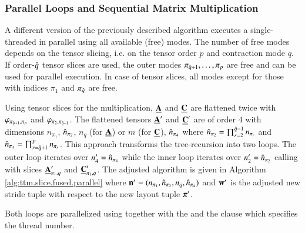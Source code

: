 \subsubsection{Parallel Loops and Sequential Matrix Multiplication}
A different version of the previously described algorithm executes a single-threaded  in parallel using all available (free) modes.
The number of free modes depends on the tensor slicing, i.e. on the tensor order $p$ and contraction mode $q$.
If order-$\hat{q}$ tensor slices are used, the outer modes $\pi_{\hat{q}+1}, \dots, \pi_{p}$ are free and can be used for parallel execution.
In case of tensor slices, all modes except for those with indices $\pi_1$ and $\pi_{\hat{q}}$ are free.



Using tensor slices for the multiplication, $\underline{\mathbf{A}}$ and $\underline{\mathbf{C}}$ are flattened twice with $\varphi_{\pi_{\hat{q}+1},\pi_p}$ and $\varphi_{\pi_{2},\pi_{\hat{q}-1}}$.
The flattened tensors $\underline{\mathbf{A}}'$ and $\underline{\mathbf{C}}'$ are of order $4$ with dimensions $n_{\pi_1}$, $\hat{n}_{\pi_2}$, $n_{q}$ (for $\underline{\mathbf{A}}$) or $m$ (for $\underline{\mathbf{C}}$), $\hat{n}_{\pi_4}$ where $\hat{n}_{\pi_2} = \prod_{r=2}^{\hat{q}-1} n_{\pi_r}$ and $\hat{n}_{\pi_4} = \prod_{r=\hat{q}+1}^{p} n_{\pi_r}$.
This approach transforms the tree-recursion into two loops.
The outer loop iterates over $n_4' = \hat{n}_{\pi_4}$ while the inner loop iterates over $n_2' = \hat{n}_{\pi_2}$ calling  with slices $\underline{\mathbf{A}}_{\pi_1,q}'$ and $\underline{\mathbf{C}}_{\pi_1,q}'$.
The adjusted algorithm is given in Algorithm \ref{alg:ttm.slice.fused.parallel} where $\mathbf{n}'=(n_{\pi_1},\hat{n}_{\pi_2},n_q,\hat{n}_{\pi_4})$ and $\mathbf{w}'$ is the adjusted new stride tuple with respect to the new layout tuple $\boldsymbol{\pi}'$.


Both loops are parallelized using  together with the  and the  clause which specifies the thread number.


